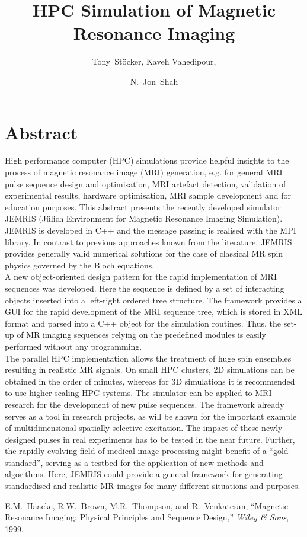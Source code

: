 \documentclass{nic-series}
\begin{document}
 

\title{HPC Simulation of Magnetic Resonance Imaging}

\author{Tony~St\"ocker, Kaveh Vahedipour, \and N.~Jon~Shah }


\maketitle

\section*{Abstract}
High performance computer (HPC) simulations provide helpful insights to the process of magnetic resonance
image (MRI) generation,  e.g. for general MRI pulse sequence design \cite{haacke} and optimisation, MRI artefact detection,
validation of experimental results, hardware optimisation, MRI sample development and for education purposes. This abstract presents
the recently developed simulator JEMRIS (J\"ulich Environment for Magnetic Resonance Imaging Simulation). JEMRIS is
developed in C++ and the message passing is realised with the MPI library. In contrast to previous approaches known from the literature,
JEMRIS provides generally valid numerical solutions for the case of classical MR spin physics governed by the Bloch equations.\\
A new object-oriented design pattern for the rapid implementation of MRI
sequences was developed. Here the sequence is defined by a set of interacting objects inserted into a left-right ordered tree structure. 
The framework provides a GUI for the rapid development of the MRI sequence tree, which is stored in XML format and parsed into a
C++ object for the simulation routines. Thus, the set-up of MR imaging sequences relying on the predefined modules is easily performed
without any programming.\\
The parallel HPC implementation allows the treatment of huge spin ensembles
resulting in realistic MR signals. On small HPC clusters, 2D simulations can be obtained in the order of minutes,
whereas for 3D simulations it is recommended to use higher scaling HPC systems. The simulator can be
applied to MRI research for the development of new pulse sequences.
The framework already serves as a tool in research projects, as will be shown for the important example of
multidimensional spatially selective excitation.
The impact of these newly designed pulses in real experiments has to be tested in the near future.
Further, the rapidly evolving field of medical image processing might benefit of a “gold standard”, serving as a testbed
for the application of new methods and algorithms. Here, JEMRIS could provide a general framework for generating
standardised and realistic MR images for many different situations and purposes.

\begin{thebibliography}{10}

E.M.~Haacke, R.W.~Brown, M.R.~Thompson, and R.~Venkatesan, ``Magnetic Resonance Imaging: Physical Principles and Sequence Design,''
  \emph{Wiley \& Sons}, 1999.
\end{thebibliography}
\end{document}
